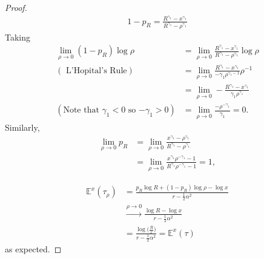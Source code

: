 \documentclass[11pt]{article}
\newcommand{\ga}{\alpha}
\newcommand{\gc}{y}
\newcommand{\gr}{\rho}
\renewcommand{\gc}{\gamma}
\renewcommand{\to}{\longrightarrow}
\newcommand{\E}{\mathbb{E}}
\begin{document}
\begin{enumerate}
\begin{proof}
\begin{align*}
1-p_R = \frac{R^{\gc_1}-x^{\gc_1}}{R^{\gc_1}-\gr^{\gc_1}}
\end{align*}
Taking
\begin{align*}
\lim_{\gr \to 0} (1-p_R) \log \gr &= \lim_{\gr \to 0} \frac{R^{\gc_1}-x^{\gc_1}}{R^{\gc_1}-\gr^{\gc_1}} \log \gr\\
(\text{ L'Hopital's Rule})&= \lim_{\gr \to 0}  \frac{R^{\gc_1}-x^{\gc_1}}{-{\gc_1}\gr^{\gc_1-1}}\gr^{-1} \\
&= \lim_{\gr \to 0} -\frac{R^{\gc_1}-x^{\gc_1}}{\gc_1 \gr^{\gc_1}}\\
(\text{Note that $\gc_1<0$ so $-\gc_1>0$})&= \lim_{\gr \to 0} \frac{-\gr^{-\gc_1}}{\gc_1}=0.
\end{align*}
Similarly, 
\begin{align*}
\lim_{\gr \to 0} p_R &= \lim_{\gr \to 0} \frac{x^{\gc_1}-\gr^{\gc_1}}{R^{\gc_1}-\gr^{\gc_1}}\\
&= \lim_{\gr \to 0} \frac{x^{\gc_1}\gr^{-\gc_1}-1}{R^{\gc_1}\gr^{-\gc_1}-1} = 1,
\end{align*}

\begin{align*}
\E^x( \tau_\gr)&= \frac{p_R \log R + (1-p_R) \log \gr - \log x}{r -\frac{1}{2}\ga^2}\\
& \xrightarrow{\gr \to 0} \frac{\log R - \log x}{r-\frac{1}{2}\ga^2}\\
&= \frac{\log \big(\frac{R}{x})}{r-\frac{1}{2}\ga^2} = \E^x(\tau)
\end{align*}
as expected.
\end{proof}
\end{enumerate}
\end{document}
